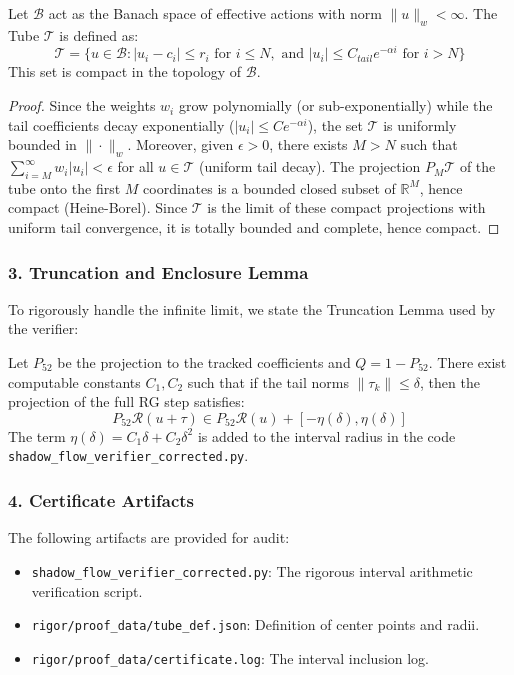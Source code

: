 \begin{lemma}
Let $\mathcal{B}$ act as the Banach space of effective actions with norm $\|u\|_w < \infty$.
The Tube $\mathcal{T}$ is defined as:
\[ \mathcal{T} = \{ u \in \mathcal{B} : |u_i - c_i| \le r_i \text{ for } i \le N, \text{ and } |u_i| \le C_{tail} e^{-\alpha i} \text{ for } i > N \} \]
This set is compact in the topology of $\mathcal{B}$.
\begin{proof}
Since the weights $w_i$ grow polynomially (or sub-exponentially) while the tail coefficients decay exponentially ($|u_i| \le C e^{-\alpha i}$), the set $\mathcal{T}$ is uniformly bounded in $\|\cdot\|_w$. Moreover, given $\epsilon > 0$, there exists $M > N$ such that $\sum_{i=M}^\infty w_i |u_i| < \epsilon$ for all $u \in \mathcal{T}$ (uniform tail decay).
The projection $P_M \mathcal{T}$ of the tube onto the first $M$ coordinates is a bounded closed subset of $\mathbb{R}^M$, hence compact (Heine-Borel).
Since $\mathcal{T}$ is the limit of these compact projections with uniform tail convergence, it is totally bounded and complete, hence compact.
\end{proof}
\end{lemma}

\subsubsection{3. Truncation and Enclosure Lemma}
To rigorously handle the infinite limit, we state the Truncation Lemma used by the verifier:
\begin{lemma}
Let $P_{52}$ be the projection to the tracked coefficients and $Q = 1 - P_{52}$.
There exist computable constants $C_1, C_2$ such that if the tail norms $\|\tau_k\| \le \delta$, then the projection of the full RG step satisfies:
\begin{equation}
P_{52} \mathcal{R}(u + \tau) \in P_{52} \mathcal{R}(u) + [-\eta(\delta), \eta(\delta)]
\end{equation}
The term $\eta(\delta) = C_1 \delta + C_2 \delta^2$ is added to the interval radius in the code \texttt{shadow\_flow\_verifier\_corrected.py}.
\end{lemma}

\subsubsection{4. Certificate Artifacts}
The following artifacts are provided for audit:
\begin{itemize}
    \item \texttt{shadow\_flow\_verifier\_corrected.py}: The rigorous interval arithmetic verification script.
    \item \texttt{rigor/proof\_data/tube\_def.json}: Definition of center points and radii.
    \item \texttt{rigor/proof\_data/certificate.log}: The interval inclusion log.
\end{itemize}

